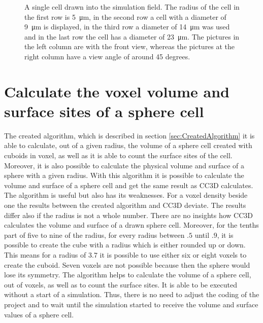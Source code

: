 \begin{figure}[!]
	
	\caption[Drawn sphere cells]{\label{img:DrawnSphereCells}A single cell drawn into the simulation field. The radius of the cell in the first row is \SI{5}{\micro\metre}, in the second row a cell with a diameter of \SI{9}{\micro\metre} is displayed, in the third row a diameter of \SI{14}{\micro\metre} was used and in the last row the cell has a diameter of \SI{23}{\micro\metre}. The pictures in the left column are with the front view, whereas the
pictures at the right column have a view angle of around 45 degrees.}
\end{figure}



\section{Calculate the voxel volume and surface sites of a sphere cell}
The created algorithm, which is described in section \ref{sec:CreatedAlgorithm} it is able to calculate, out of a given radius, the volume of a sphere cell created with cuboids in voxel, as well as it is able to count the surface sites of the cell. Moreover, it is also possible to calculate the physical volume and surface of a sphere with a given radius. With this algorithm it is possible to calculate the volume and surface of a sphere cell and get the same result as \ac{CC3D} calculates. \newline
The algorithm is useful but also has its weaknesses. For a voxel density beside one the results between the created algorithm and \ac{CC3D} deviate. The results differ also if the radius is not a whole number. There are no insights how \ac{CC3D} calculates the volume and surface of a drawn sphere cell. Moreover, for the tenths part of five to nine of the radius, for every radius between $.5$ until $.9$, it is possible to create the cube with a radius which is either rounded up or down. This means for a radius of $3.7$ it is possible to use either six or eight voxels to create the cuboid. Seven voxels are not possible because then the sphere would lose its symmetry. \newline
The algorithm helps to calculate the volume of a sphere cell, out of voxels, as well as to count the surface sites. It is able to be executed without a start of a simulation. Thus, there is no need to adjust the coding of the project and to wait until the simulation started to receive the volume and surface values of a sphere cell.


